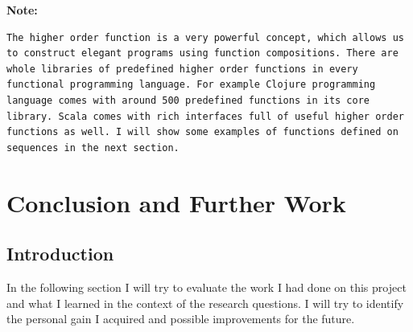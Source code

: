\documentclass[12pt,twoside,a4paper]{report}
\begin{document}
\textbf{Note:}
\begin{lstlisting}
The higher order function is a very powerful concept, which allows us to construct elegant programs using function compositions. There are whole libraries of predefined higher order functions in every functional programming language. For example Clojure programming language comes with around 500 predefined functions in its core library. Scala comes with rich interfaces full of useful higher order functions as well. I will show some examples of functions defined on sequences in the next section.
\end{lstlisting}









\chapter{Conclusion and Further Work}\label{7}

\section{Introduction}\label{7.1}
In the following section I will try to evaluate the work I had done on this project and what I learned in the context of the research questions. I will try to identify the personal gain I acquired and possible improvements for the future.

\end{document}
